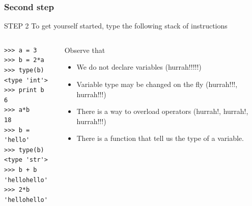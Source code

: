 \documentclass[colorlinks]{beamer}
\begin{document}
\begin{frame}[fragile]\frametitle{Second step}
\vspace{-0.1cm}
\begin{block}{\centering STEP 2}
\centering To get yourself started, type the following stack of instructions
\end{block}
 \begin{columns}[T]
\begin{column}{.5\textwidth}
\tiny
\begin{verbatim}
>>> a = 3
>>> b = 2*a
>>> type(b)
<type 'int'>
>>> print b
6
>>> a*b
18
>>> b = 'hello'
>>> type(b)
<type 'str'>
>>> b + b
'hellohello'
>>> 2*b
'hellohello'
\end{verbatim}


\end{column}
    \begin{column}{.5\textwidth}
    \begin{block}{\centering Observe that}
            \begin{itemize}
\scriptsize    
                \item We do not declare variables (hurrah!!!!!) 
                \item Variable type may be changed on the fly (hurrah!!!, hurrah!!!)
                \item There is a way to overload operators (hurrah!, hurrah!, hurrah!!!)\\
                \item There is a function that tell us the type of a variable.
            \end{itemize}
       \end{block}

\end{column}
\end{columns}
\end{frame}
\end{document}

